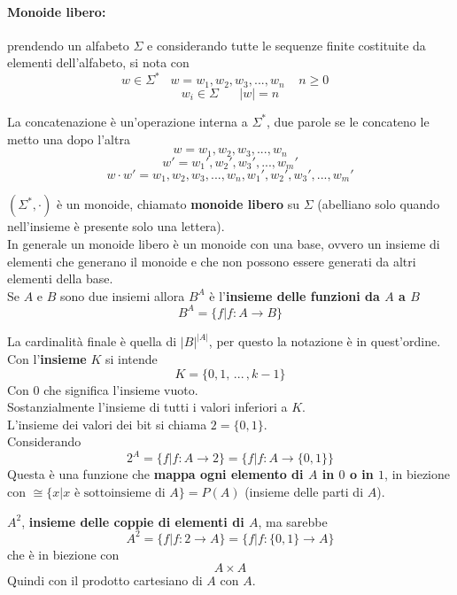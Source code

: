 \documentclass[11pt]{article}
\begin{document}
	\paragraph{Monoide libero:} prendendo un alfabeto $\Sigma$ e considerando tutte le sequenze finite costituite da elementi dell'alfabeto, si nota con 
	$$w \in \Sigma^{\ast} \;\;\; w = w_1, w_2, w_3, ... , w_n \;\;\;\; n \geq 0 \;\;\;$$
	$$ w_i \in \Sigma \;\;\;\;\;\; |w| = n$$
	
	\newpage
	
	La concatenazione è un'operazione interna a $\Sigma^{\ast}$, due parole se le concateno le metto una dopo l'altra
	$$ w = w_1, w_2, w_3, ... , w_n $$ 
	$$ w' = w_1', w_2', w_3', ... , w_m' $$ 
	$$ w \cdot w' = w_1, w_2, w_3, ... , w_n, w_1', w_2', w_3', ... , w_m'  $$
	
	$(\Sigma^\ast, \cdot)$ è un monoide, chiamato \textbf{monoide libero} su $\Sigma$ (abelliano solo quando nell'insieme è presente solo una lettera). \\
	
	In generale un monoide libero è un monoide con una base, ovvero un insieme di elementi che generano il monoide e che non possono essere generati da altri elementi della base.\\
	
	Se $A$ e $B$ sono due insiemi allora $B^A$ è l'\textbf{insieme delle funzioni da $A$ a $B$}
	$$ B^A = \{f | f : A \rightarrow B\}$$
	
	La cardinalità finale è quella di $|B|^{|A|}$, per questo la notazione è in quest'ordine.\\
	
	Con l'\textbf{insieme} $K$ si intende 
	$$ K = \{0, 1, \, ... \, , k-1\}$$
	Con $0$ che significa l'insieme vuoto.\\
	
	Sostanzialmente l'insieme di tutti i valori inferiori a $K$.\\
	L'insieme dei valori dei bit si chiama $2 = \{0,1\}$.\\
	
	Considerando
	$$ 2^A = \{f | f : A \rightarrow 2\} = \{f | f : A \rightarrow \{0,1\}\}$$
	Questa è una funzione che \textbf{mappa ogni elemento di $A$ in $0$ o in $1$}, in biezione con $\cong \{x | x \text{ è sottoinsieme di } A\} = P(A)$ (insieme delle parti di $A$).\\
	
	\newpage
	
	$A^2$, \textbf{insieme delle coppie di elementi di $A$}, ma sarebbe 
	$$ A^2 = \{f | f : 2 \rightarrow A\} = \{f|f : \{0,1\} \rightarrow A\} $$
	che è in biezione con
	$$ A \times A $$
	Quindi con il prodotto cartesiano di $A$ con $A$.\\
	
\end{document}

